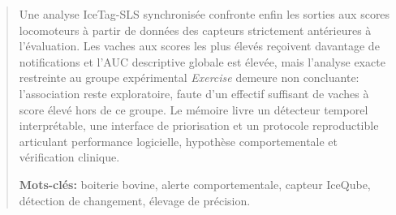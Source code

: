 \begin{abstract}
Une analyse IceTag-SLS synchronisée confronte enfin les sorties aux scores locomoteurs à partir
de données des capteurs strictement antérieures à l'évaluation. Les vaches aux scores les plus
élevés reçoivent davantage de notifications et l'AUC descriptive globale est élevée, mais
l'analyse exacte restreinte au groupe expérimental \textit{Exercise} demeure non concluante:
l'association reste exploratoire, faute d'un effectif suffisant de vaches à score élevé hors de
ce groupe. Le mémoire livre un détecteur temporel interprétable, une interface de priorisation
et un protocole reproductible articulant performance logicielle, hypothèse comportementale et
vérification clinique.

\vspace{1em}
\textbf{Mots-clés:} boiterie bovine, alerte comportementale, capteur IceQube, détection de
changement, élevage de précision.
\end{abstract}

